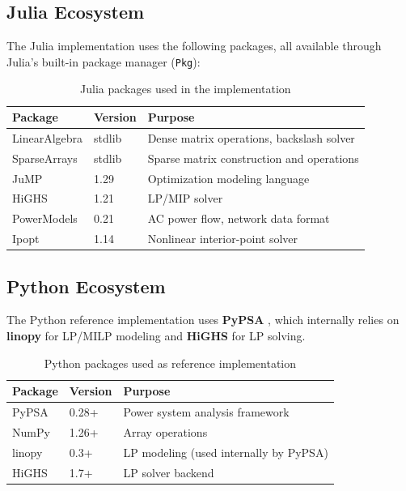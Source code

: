 \subsection{Julia Ecosystem}

The Julia implementation uses the following packages, all available through Julia's built-in package manager (\texttt{Pkg}):

\begin{table}[H]
\centering
\caption{Julia packages used in the implementation}
\label{tab:julia_packages}
\begin{tabular}{lll}
\toprule
\textbf{Package} & \textbf{Version} & \textbf{Purpose} \\
\midrule
LinearAlgebra & stdlib & Dense matrix operations, backslash solver \\
SparseArrays  & stdlib & Sparse matrix construction and operations \\
JuMP          & 1.29   & Optimization modeling language \\
HiGHS         & 1.21   & LP/MIP solver \\
PowerModels   & 0.21   & AC power flow, network data format \\
Ipopt         & 1.14   & Nonlinear interior-point solver \\
\bottomrule
\end{tabular}
\end{table}

\subsection{Python Ecosystem}

The Python reference implementation uses \textbf{PyPSA} \cite{brown2018pypsa}, which internally relies on \textbf{linopy} for LP/MILP modeling and \textbf{HiGHS} for LP solving.

\begin{table}[H]
\centering
\caption{Python packages used as reference implementation}
\label{tab:python_packages}
\begin{tabular}{lll}
\toprule
\textbf{Package} & \textbf{Version} & \textbf{Purpose} \\
\midrule
PyPSA    & 0.28+ & Power system analysis framework \\
NumPy    & 1.26+ & Array operations \\
linopy   & 0.3+  & LP modeling (used internally by PyPSA) \\
HiGHS    & 1.7+  & LP solver backend \\
\bottomrule
\end{tabular}
\end{table}

